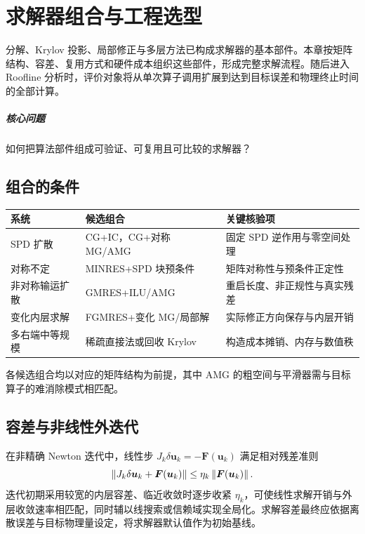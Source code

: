 \chapter{求解器组合与工程选型}\label{v0ch:21}
\begin{chaptersummary}
分解、Krylov 投影、局部修正与多层方法已构成求解器的基本部件。本章按矩阵结构、容差、复用方式和硬件成本组织这些部件，形成完整求解流程。随后进入 Roofline 分析时，评价对象将从单次算子调用扩展到达到目标误差和物理终止时间的全部计算。
\end{chaptersummary}
\paragraph{核心问题}如何把算法部件组成可验证、可复用且可比较的求解器？

\section{组合的条件}
\begin{center}\small
\begin{tabularx}{\textwidth}{lXX}
\toprule 系统&候选组合&关键核验项\\\midrule
SPD 扩散&CG+IC，CG+对称 MG/AMG&固定 SPD 逆作用与零空间处理\\
对称不定&MINRES+SPD 块预条件&矩阵对称性与预条件正定性\\
非对称输运扩散&GMRES+ILU/AMG&重启长度、非正规性与真实残差\\
变化内层求解&FGMRES+变化 MG/局部解&实际修正方向保存与内层开销\\
多右端中等规模&稀疏直接法或回收 Krylov&构造成本摊销、内存与数值秩\\\bottomrule
\end{tabularx}
\end{center}
各候选组合均以对应的矩阵结构为前提，其中 AMG 的粗空间与平滑器需与目标算子的难消除模式相匹配。
\section{容差与非线性外迭代}
在非精确 Newton 迭代中，线性步 $J_k\delta\bm u_k=-\bm F(\bm u_k)$ 满足相对残差准则
\[
 \left\lVert J_k\delta\bm u_k+\bm F(\bm u_k)\right\rVert
 \le\eta_k\left\lVert \bm F(\bm u_k)\right\rVert.
\]
迭代初期采用较宽的内层容差、临近收敛时逐步收紧 $\eta_k$，可使线性求解开销与外层收敛速率相匹配，同时辅以线搜索或信赖域实现全局化。求解容差最终应依据离散误差与目标物理量设定，将求解器默认值作为初始基线。
